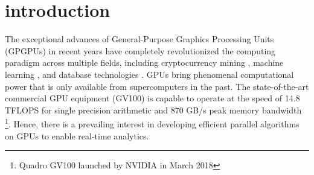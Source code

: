 \section{introduction}
The exceptional advances of General-Purpose Graphics Processing Units (GPGPUs) 
in recent years have completely revolutionized the computing paradigm across multiple fields, including cryptocurrency mining \cite{o2014bitcoin,taylor2013bitcoin}, machine learning \cite{coates2013deep,abadi2016tensorflow}, and database technologies \cite{bakkum2010accelerating,kaldewey2012gpu}.
GPUs bring phenomenal computational power that is only available from supercomputers in the past. 
The state-of-the-art commercial GPU equipment (GV100) is capable to operate at the speed of 14.8 TFLOPS for single precision arithmetic and 870 GB/s peak memory bandwidth \footnote{Quadro GV100 launched by NVIDIA in March 2018}. 
Hence, there is a prevailing interest in developing efficient parallel algorithms on GPUs to enable real-time analytics.


